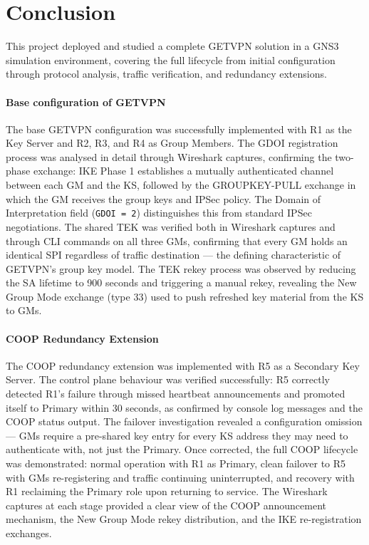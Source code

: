 \documentclass[12pt]{article}
\begin{document}
\section{Conclusion}

This project deployed and studied a complete GETVPN solution in a GNS3 
simulation environment, covering the full lifecycle from initial configuration 
through protocol analysis, traffic verification, and redundancy extensions.

\paragraph{Base configuration of GETVPN}

The base GETVPN configuration was successfully implemented with R1 as the Key 
Server and R2, R3, and R4 as Group Members. The GDOI registration process was 
analysed in detail through Wireshark captures, confirming the two-phase 
exchange: IKE Phase 1 establishes a mutually authenticated channel between each 
GM and the KS, followed by the GROUPKEY-PULL exchange in which the GM receives 
the group keys and IPSec policy. The Domain of Interpretation field 
(\texttt{GDOI = 2}) distinguishes this from standard IPSec negotiations. The 
shared TEK was verified both in Wireshark captures and through CLI commands on 
all three GMs, confirming that every GM holds an identical SPI regardless of 
traffic destination — the defining characteristic of GETVPN's group key model. 
The TEK rekey process was observed by reducing the SA lifetime to 900 seconds 
and triggering a manual rekey, revealing the New Group Mode exchange (type 33) 
used to push refreshed key material from the KS to GMs.

\paragraph{COOP Redundancy Extension}

The COOP redundancy extension was implemented with R5 as a Secondary Key 
Server. The control plane behaviour was verified successfully: R5 correctly 
detected R1's failure through missed heartbeat announcements and promoted itself 
to Primary within 30 seconds, as confirmed by console log messages and the 
COOP status output. The failover investigation revealed a configuration omission 
— GMs require a pre-shared key entry for every KS address they may need to 
authenticate with, not just the Primary. Once corrected, the full COOP lifecycle 
was demonstrated: normal operation with R1 as Primary, clean failover to R5 
with GMs re-registering and traffic continuing uninterrupted, and recovery with 
R1 reclaiming the Primary role upon returning to service. The Wireshark captures 
at each stage provided a clear view of the COOP announcement mechanism, the New 
Group Mode rekey distribution, and the IKE re-registration exchanges.
\end{document}
